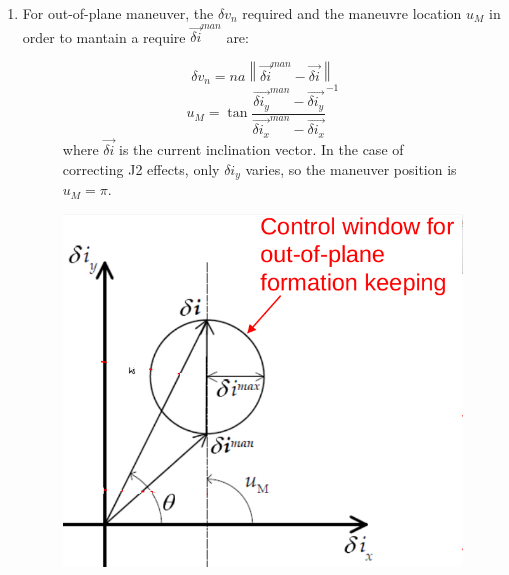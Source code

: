 \documentclass[a4paper]{report}
\newcommand\norm[1]{\left\lVert#1\right\rVert}
\begin{document}
\begin{enumerate}[label=\emph{\alph*)}]
  \item %
    For out-of-plane maneuver, the $\delta v_n$ required and the maneuvre location $u_M$ in order to mantain a require $\vec{\delta i}^{man}$ are:
    \begin{figure}[h]
      \begin{minipage}{0.5\textwidth}
	\[\delta v_n = n a \norm{\vec{\delta i}^{man}-\vec{\delta i}} \]
	\[ u_M = \tan{\frac{\vec{\delta i_y}^{man}-\vec{\delta i_y}}{\vec{\delta i_x}^{man}-\vec{\delta i_x}}}^{-1} \]
	where $\vec{\delta i}$ is the current inclination vector. In the case of correcting J2 effects, only $\delta i_y$ varies, so the maneuver position is $u_M = \pi$.
      \end{minipage}
      \begin{minipage}{0.5\textwidth}
	\centering
	\includegraphics[width=\textwidth]{Out-of-plane_maneuvre}
      \end{minipage}
    \end{figure}


\end{enumerate}
\end{document}

